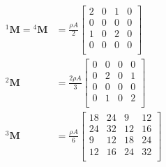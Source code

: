 \documentclass[12pt]{article}
\begin{document}
\begin{minipage}{0.48\textwidth}
	\begin{align*}
		{}^1\mathbf M ={}^4\mathbf M & =\frac{\rho A}{2}\begin{bmatrix}
			                                                2 & 0 & 1 & 0 \\
			                                                0 & 0 & 0 & 0 \\
			                                                1 & 0 & 2 & 0 \\
			                                                0 & 0 & 0 & 0 \\
		                                                \end{bmatrix}    \\
		{}^2\mathbf M                & =\frac{2\rho A}{3}\begin{bmatrix}
			                                                 0 & 0 & 0 & 0 \\
			                                                 0 & 2 & 0 & 1 \\
			                                                 0 & 0 & 0 & 0 \\
			                                                 0 & 1 & 0 & 2 \\
		                                                 \end{bmatrix}   \\
		{}^3\mathbf M                & =\frac{\rho A}{6}\begin{bmatrix}
			                                                18 & 24 & 9  & 12 \\
			                                                24 & 32 & 12 & 16 \\
			                                                9  & 12 & 18 & 24 \\
			                                                12 & 16 & 24 & 32 \\
		                                                \end{bmatrix}
	\end{align*}
\end{minipage}
\vspace{0.3cm}
\end{document}
